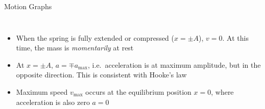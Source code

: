 \documentclass[12pt,compress,aspectratio=169]{beamer}
\begin{document}
\begin{frame}{Motion Graphs}
\begin{columns}

    \begin{itemize}
    \item<2->{\color{magenta}When the spring is fully extended or compressed
      ($x=\pm A$), $v=0$. At this time, the mass is \emph{momentarily} at rest}
    \item<3->{\color{magenta}At $x=\pm A$, $a=\mp a_\text{max}$, i.e.\
      acceleration is at maximum amplitude, but in the opposite direction. This
      is consistent with Hooke's law}
    \item<4->{\color{violet}Maximum speed $v_\text{max}$ occurs at the
      equilibrium position $x=0$, where acceleration is also zero $a=0$}
   \end{itemize}
  \end{columns}
\end{frame}
\end{document}
